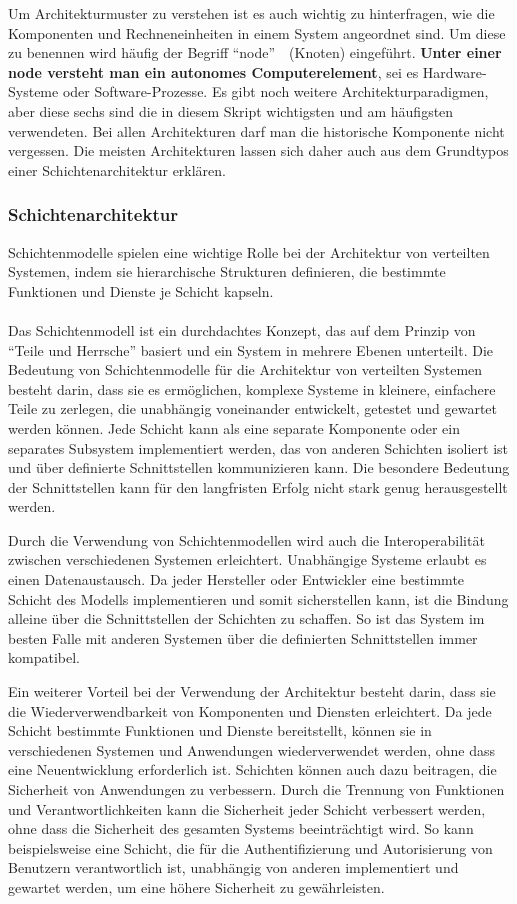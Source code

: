 Um Architekturmuster zu verstehen ist es auch wichtig zu hinterfragen, wie die Komponenten und Rechneneinheiten in einem System angeordnet sind. Um diese zu benennen wird häufig der Begriff \enquote{node}~\cite{tanenbaum2017distributed}~(Knoten) eingeführt. \textbf{Unter einer node versteht man ein autonomes Computerelement}, sei es Hardware-Systeme oder Software-Prozesse. 
Es gibt noch weitere Architekturparadigmen, aber diese sechs sind die in diesem Skript wichtigsten und am häufigsten verwendeten. Bei allen Architekturen darf man die historische Komponente nicht vergessen. Die meisten Architekturen lassen sich daher auch aus dem Grundtypos einer Schichtenarchitektur erklären. 

\subsubsection{Schichtenarchitektur}

Schichtenmodelle spielen eine wichtige Rolle bei der Architektur von verteilten Systemen, indem sie hierarchische Strukturen definieren, die bestimmte Funktionen und Dienste je Schicht kapseln.
\\\\
Das Schichtenmodell ist ein durchdachtes Konzept, das auf dem Prinzip von \enquote{Teile und Herrsche} basiert und ein System in mehrere Ebenen unterteilt. Die Bedeutung von Schichtenmodelle für die Architektur von verteilten Systemen besteht darin, dass sie es ermöglichen, komplexe Systeme in kleinere, einfachere Teile zu zerlegen, die unabhängig voneinander entwickelt, getestet und gewartet werden können. Jede Schicht kann als eine separate Komponente oder ein separates Subsystem implementiert werden, das von anderen Schichten isoliert ist und über definierte Schnittstellen kommunizieren kann. Die besondere Bedeutung der Schnittstellen kann für den langfristen Erfolg nicht stark genug herausgestellt werden.

Durch die Verwendung von Schichtenmodellen wird auch die Interoperabilität zwischen verschiedenen Systemen erleichtert. Unabhängige Systeme erlaubt es einen Datenaustausch. Da jeder Hersteller oder Entwickler eine bestimmte Schicht des Modells implementieren und somit sicherstellen kann, ist die Bindung alleine über die Schnittstellen der Schichten zu schaffen. So ist das System im besten Falle mit anderen Systemen über die definierten Schnittstellen immer kompatibel.

Ein weiterer Vorteil bei der Verwendung der Architektur besteht darin, dass sie die Wiederverwendbarkeit von Komponenten und Diensten erleichtert. Da jede Schicht bestimmte Funktionen und Dienste bereitstellt, können sie in verschiedenen Systemen und Anwendungen wiederverwendet werden, ohne dass eine Neuentwicklung erforderlich ist. Schichten können auch dazu beitragen, die Sicherheit von Anwendungen zu verbessern. Durch die Trennung von Funktionen und Verantwortlichkeiten kann die Sicherheit jeder Schicht verbessert werden, ohne dass die Sicherheit des gesamten Systems beeinträchtigt wird. So kann beispielsweise eine Schicht, die für die Authentifizierung und Autorisierung von Benutzern verantwortlich ist, unabhängig von anderen implementiert und gewartet werden, um eine höhere Sicherheit zu gewährleisten.

